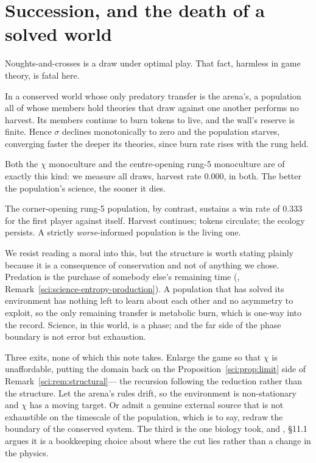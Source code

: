 \section{Succession, and the death of a solved world}\label{gam:sec:death}\label{gam:S10}

Noughts-and-crosses is a draw under optimal play. That fact, harmless in game
theory, is fatal here.

\begin{proposition}\label{gam:solved-science-dead-ecology}
In a conserved world whose only predatory transfer is the arena's, a population
all of whose members hold theories that draw against one another performs no
harvest. Its members continue to burn tokens to live, and the wall's reserve is
finite. Hence $\sigma$ declines monotonically to zero and the population starves,
converging faster the deeper its theories, since burn rate rises with the rung
held.
\end{proposition}

Both the $\chi$ monoculture and the centre-opening rung-5 monoculture are of
exactly this kind: we measure all draws, harvest rate $0.000$, in both. The
better the population's science, the sooner it dies.

\begin{corollary}\label{gam:imperfection-load-bearing}
The corner-opening rung-5 population, by contrast, sustains a win rate of
$0.333$ for the first player against itself. Harvest continues; tokens
circulate; the ecology persists. A strictly \emph{worse}-informed population is
the living one.
\end{corollary}

We resist reading a moral into this, but the structure is worth stating plainly
because it is a consequence of conservation and not of anything we chose.
Predation is the purchase of somebody else's remaining time (\chSci,
Remark~\ref{sci:science-entropy-production}). A population that has solved its environment has nothing left to
learn about each other and no asymmetry to exploit, so the only remaining
transfer is metabolic burn, which is one-way into the record. Science, in this
world, is a phase; and the far side of the phase boundary is not error but
exhaustion.

\begin{remark}\label{gam:what-would-keep-alive}
Three exits, none of which this note takes. Enlarge the game so that $\chi$ is
unaffordable, putting the domain back on the Proposition~\ref{sci:prop:limit} side of Remark~\ref{sci:rem:structural}---
the recursion following the reduction rather than the structure. Let the arena's
rules drift, so the environment is non-stationary and $\chi$ has a moving
target. Or admit a genuine external source that is not exhaustible on the
timescale of the population, which is to say, redraw the boundary of the
conserved system. The third is the one biology took, and \chSci,
\S11.1 argues it is a bookkeeping choice about where the cut lies rather than a
change in the physics.
\end{remark}

